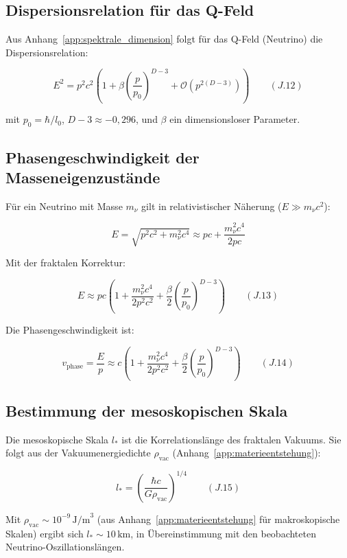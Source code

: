 \subsection{Dispersionsrelation für das Q-Feld}
\label{sub:neutrino_oszillation_dispersion}

Aus Anhang~\ref{app:spektrale_dimension} folgt für das Q-Feld (Neutrino) die Dispersionsrelation:

\[
E^2 = p^2 c^2 \left(1 + \beta \left(\frac{p}{p_0}\right)^{D-3} + \mathcal{O}(p^{2(D-3)})\right) \qquad (J.12)
\]

mit $p_0 = \hbar/l_0$, $D-3 \approx -0,296$, und $\beta$ ein dimensionsloser Parameter.

\subsection{Phasengeschwindigkeit der Masseneigenzustände}
\label{sub:neutrino_oszillation_phasengeschw}

Für ein Neutrino mit Masse $m_{\nu}$ gilt in relativistischer Näherung ($E \gg m_{\nu}c^2$):

\[
E = \sqrt{p^2 c^2 + m_{\nu}^2 c^4} \approx pc + \frac{m_{\nu}^2 c^4}{2pc}
\]

Mit der fraktalen Korrektur:

\[
E \approx pc \left(1 + \frac{m_{\nu}^2 c^4}{2p^2 c^2} + \frac{\beta}{2} \left(\frac{p}{p_0}\right)^{D-3}\right) \qquad (J.13)
\]

Die Phasengeschwindigkeit ist:

\[
v_{\text{phase}} = \frac{E}{p} \approx c \left(1 + \frac{m_{\nu}^2 c^4}{2p^2 c^2} + \frac{\beta}{2} \left(\frac{p}{p_0}\right)^{D-3}\right) \qquad (J.14)
\]

\subsection{Bestimmung der mesoskopischen Skala}
\label{sub:neutrino_oszillation_mesoskala}

Die mesoskopische Skala $l_*$ ist die Korrelationslänge des fraktalen Vakuums.
Sie folgt aus der Vakuumenergiedichte $\rho_{\text{vac}}$ (Anhang~\ref{app:materieentstehung}):

\[
l_* = \left( \frac{\hbar c}{G \rho_{\text{vac}}} \right)^{1/4} \qquad (J.15)
\]

Mit $\rho_{\text{vac}} \sim 10^{-9}\,\text{J/m}^3$ (aus Anhang~\ref{app:materieentstehung} für makroskopische Skalen)
ergibt sich $l_* \sim 10\,\text{km}$, in Übereinstimmung mit den beobachteten 
Neutrino-Oszillationslängen.


